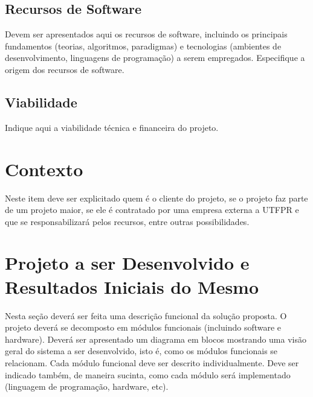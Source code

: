\documentclass[a4paper,12pt]{article}
\begin{document}
\subsection{Recursos de Software}
Devem ser apresentados aqui os recursos de software, incluindo os principais fundamentos (teorias, algoritmos, paradigmas) e tecnologias (ambientes de desenvolvimento, linguagens de programação) a serem empregados. Especifique a origem dos recursos de software.

\subsection{Viabilidade}
Indique aqui a viabilidade técnica e financeira do projeto.

\section{Contexto}
Neste item deve ser explicitado quem é o cliente do projeto, se o projeto faz parte de um projeto maior, se ele é contratado por uma empresa externa a UTFPR e que se responsabilizará pelos recursos, entre outras possibilidades.

\section{Projeto a ser Desenvolvido e Resultados Iniciais do Mesmo}
Nesta seção deverá ser feita uma descrição funcional da solução proposta. O projeto deverá se decomposto em módulos funcionais (incluindo software e hardware). 
Deverá ser apresentado um diagrama em blocos mostrando uma visão geral do sistema a ser desenvolvido, isto é, como os módulos funcionais se relacionam.
Cada módulo funcional deve ser descrito individualmente. 
Deve ser indicado também, de maneira sucinta, como cada módulo será implementado (linguagem de programação, hardware, etc).
\end{document}
